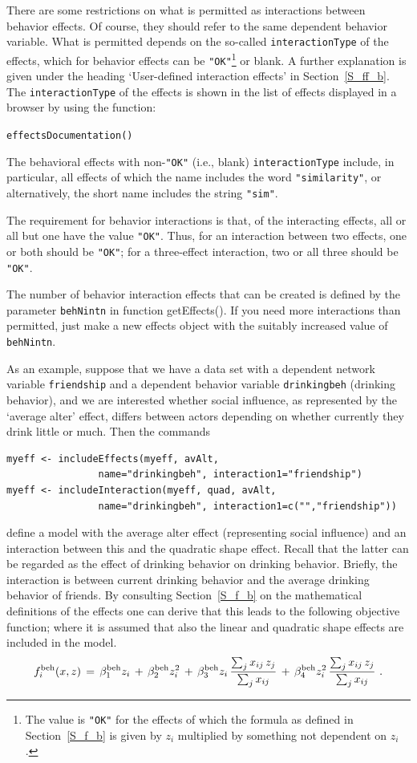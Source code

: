 \documentclass[a4paper,fleqn,11pt]{article}
\newcommand{\+}{\, + \,}
\newcommand{\sfn}[1]{\textsf{#1}}
\begin{document}
There are some restrictions on what is permitted
as interactions between behavior effects.
Of course,  they should refer to the same dependent behavior variable.
What is permitted depends on the so-called \texttt{interactionType} of the
effects, which for behavior effects can be \texttt{"OK"}\footnote{The value
is \texttt{"OK"} for the effects of which the
formula as defined in Section~\ref{S_f_b}
is given by $z_i$ multiplied by something not dependent on $z_i$.}
or blank.
A further explanation is given under the heading `User-defined interaction effects'
in Section~\ref{S_ff_b}.
The \texttt{interactionType} of the effects
is shown in the list of effects displayed in a browser by using the function:

\verb|effectsDocumentation()|
\bigskip

The behavioral effects with non-\texttt{"OK"} (i.e., blank)
\texttt{interactionType} include,
in particular, all effects of which the name
includes the word \texttt{"similarity"},
or alternatively, the short name includes the string \texttt{"sim"}.

The requirement for behavior interactions is that,
of the interacting effects, all or all but one have
the value \texttt{"OK"}. Thus, for an interaction between two effects,
one or both should be \texttt{"OK"}; for a three-effect interaction,
two or all three should be \texttt{"OK"}.

The number of behavior interaction effects that can be created is defined by the
parameter \texttt{behNintn} in function \sfn{getEffects()}. If you need more
interactions than permitted, just make a new effects object with the
suitably increased value of \texttt{behNintn}.

As an example, suppose that we have a data set with a dependent
network variable \texttt{friendship} and a dependent behavior variable
\texttt{drinkingbeh} (drinking behavior), and we are interested whether
social influence, as represented by the `average alter' effect, differs
between actors depending on whether currently they drink little or much.
Then the commands
\begin{verbatim}
myeff <- includeEffects(myeff, avAlt,
                name="drinkingbeh", interaction1="friendship")
myeff <- includeInteraction(myeff, quad, avAlt,
                name="drinkingbeh", interaction1=c("","friendship"))
\end{verbatim}
define a model with the average alter effect (representing social influence)
and an interaction between this and the quadratic shape effect.
Recall that the latter can be regarded
as the effect of drinking behavior on drinking behavior.
Briefly, the interaction is between current drinking behavior
and the average drinking behavior of friends.
By consulting Section~\ref{S_f_b} on the mathematical definitions of the
effects one can derive that this leads to the following objective function;
where it is assumed that also the linear and quadratic shape effects are
included in the model.
\[
f^{\rm beh}_i(x, z) \,=\, \beta^{\rm beh}_1 z_i \,+\, \beta^{\rm beh}_2 z_i^2
        \,+\, \beta^{\rm beh}_3 z_i \,
        \frac{ \sum_j x_{ij}\, z_j }{\sum_j x_{ij}}
       \,+\, \beta^{\rm beh}_4 z_i^2 \,
              \frac{ \sum_j x_{ij}\, z_j }{\sum_j x_{ij}} \ .
\]
\medskip
\end{document}
